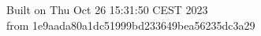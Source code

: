 {\noindent Built on Thu Oct 26 15:31:50 CEST 2023} \\ 
 {\noindent from 1e9aada80a1dc51999bd233649bea56235dc3a29}
